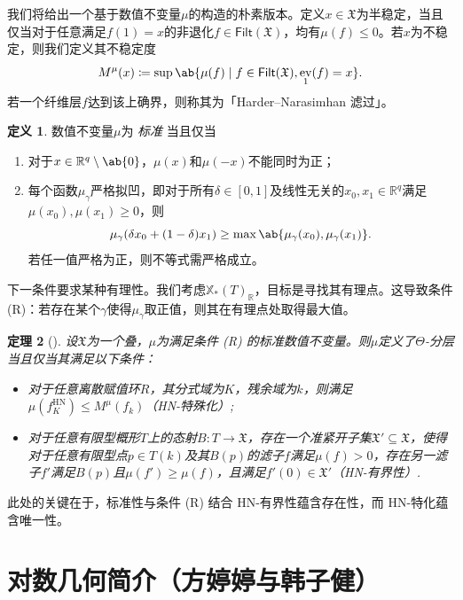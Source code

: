 \documentclass{amsart}
\newtheorem{thm}{定理}[section]
\theoremstyle{definition}
\newtheorem{defn}[thm]{定义}
\theoremstyle{remark}
\theoremstyle{plain}
\theoremstyle{definition}
\theoremstyle{remark}
\newcommand{\R}{\mathbb{R}}
\newcommand{\mf}[1]{\mathfrak{#1}}
\newcommand{\mr}[1]{\mathrm{#1}}
\newcommand{\ms}[1]{\mathsf{#1}}
\newcommand{\1}{\mathbf{1}}
\newcommand{\2}{\mathbf{2}}
\newcommand{\3}{\mathbf{3}}
\DeclareMathOperator{\ev}{ev}
\begin{document}
我们将给出一个基于数值不变量\(\mu\)的构造的朴素版本。定义\(x \in \mf{X}\)为半稳定，当且仅当对于任意满足\(f(1) = x\)的非退化\(f \in \ms{Filt}(\mf{X})\)，均有\(\mu(f) \leq 0\)。若\(x\)为不稳定，则我们定义其不稳定度
\[ M^{\mu}(x) \coloneqq \sup \ab\{ \mu(f) \mid f \in \ms{Filt}(\mf{X}), \ev_1(f) = x\}. \]
若一个纤维层\(f\)达到该上确界，则称其为「Harder--Narasimhan 滤过」。

\begin{defn}
数值不变量\(\mu\)为 \textit{ 标准 } 当且仅当
    \begin{enumerate}
\item 对于\(x \in \R^q \setminus \ab\{0\}\)，\(\mu(x)\)和\(\mu(-x)\)不能同时为正；
\item 每个函数\(\mu_{\gamma}\)严格拟凹，即对于所有\(\delta \in [0,1]\)及线性无关的\(x_0, x_1 \in \R^q\)满足\(\mu(x_0), \mu(x_1) \geq 0\)，则
\[\mu_{\gamma}(\delta x_0 + (1-\delta)x_1) \geq \max\ab\{\mu_{\gamma}(x_0), \mu_{\gamma}(x_1)\}.\] 若任一值严格为正，则不等式需严格成立。
    \end{enumerate}
\end{defn}

下一条件要求某种有理性。我们考虑\(\mathbb{X}_*(T)_{\R}\)，目标是寻找其有理点。这导致条件 (R)：若存在某个\(\gamma\)使得\(\mu_{\gamma}\)取正值，则其在有理点处取得最大值。

\begin{thm}[{\cite{HLinstability}}]
设\(\mf{X}\)为一个叠，\(\mu\)为满足条件 (R) 的标准数值不变量。则\(\mu\)定义了\(\Theta\)-分层当且仅当其满足以下条件：
    \begin{itemize}
        \item 对于任意离散赋值环\(R\)，其分式域为\(K\)，残余域为\(k\)，则满足\(\mu(f_K^{\mr{HN}}) \leq M^{\mu}(f_k)\)（HN-特殊化）;
        \item 对于任意有限型概形\(T\)上的态射\(B \colon T \to \mf{X}\)，存在一个准紧开子集\(\mf{X}' \subseteq \mf{X}\)，使得对于任意有限型点\(p \in T(k)\)及其\(B(p)\)的滤子\(f\)满足\(\mu(f) > 0\)，存在另一滤子\(f'\)满足\(B(p)\)且\(\mu(f') \geq \mu(f)\)，且满足\(f'(0) \in \mf{X}'\)（HN-有界性）.
    \end{itemize}
\end{thm}

此处的关键在于，标准性与条件 (R) 结合 HN-有界性蕴含存在性，而 HN-特化蕴含唯一性。



\section{对数几何简介（方婷婷与韩子健）}%
\label{sec:Intro to log geometry (方婷婷 and 韩子健)}
\end{document}
